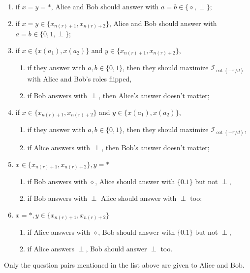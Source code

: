 \documentclass[11pt,letterpaper]{article}
\newcommand{\1}{\mathbb{1}}
\newcommand{\nr}{n(r)}
\newcommand{\I}{\mathcal{I}}
\theoremstyle{definition}
\begin{document}
\begin{enumerate}
	\item if $x = y = \ast$, Alice and Bob should answer with $a = b \in \{\diamond, \perp\}$;
	\item if $x = y \in \{x_{\nr+1}, x_{\nr+2}\}$, Alice and Bob should answer with $a = b \in \{0, 1, \perp\}$;
	\item if $x \in \{x(a_1),x(a_2)\}$ and $y \in \{x_{\nr+1}, x_{\nr+2}\}$, 
		\begin{enumerate}
		\item if they answer with $a,b \in \{0,1\}$, then
	they should maximize $\I_{\cot(-\pi/d)}$ with Alice and Bob's roles flipped, 
		\item if Bob answers with $\perp$, then Alice's answer doesn't matter;
		\end{enumerate}
	\item if $x \in \{x_{\nr+1}, x_{\nr+2}\}$ and $y \in \{x(a_1),x(a_2)\}$,
	\begin{enumerate} 
		\item if they answer with $a,b \in \{0,1\}$, then
		they should maximize $\I_{\cot(-\pi/d)}$, 
		\item if Alice answers with $\perp$, then Bob's answer doesn't matter;
	\end{enumerate}
	\item $x \in \{x_{\nr+1},x_{\nr+2}\}, y = \ast$ 
		\begin{enumerate}
		\item if Bob answers with $\diamond$, Alice should answer with $\{0.1\}$ but not $\perp$, 
		\item if Bob answers with $\perp$ Alice should answer with $\perp$ too;
		\end{enumerate}
	\item $x = \ast, y \in \{x_{\nr+1}, x_{\nr+2}\}$
	\begin{enumerate}
		\item if Alice answers with $\diamond$, Bob should answer with $\{0.1\}$ but not $\perp$, 
		\item if Alice answers $\perp$, Bob should answer $\perp$ too.
	\end{enumerate}
\end{enumerate}
Only the question pairs mentioned in the list above are given to Alice and Bob.
\end{document}

